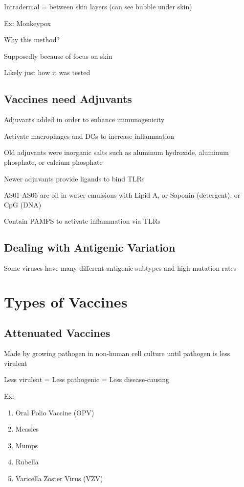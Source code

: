 \documentclass{notes}
\begin{document}
Intradermal = between skin layers (can see bubble under skin)

Ex: Monkeypox

Why this method?

\tab \indicates Supposedly because of focus on skin

\tab \indicates Likely just how it was tested

\subsection*{Vaccines need Adjuvants}
Adjuvants added in order to enhance immunogenicity

\tab \indicates Activate macrophages and DCs to increase inflammation

Old adjuvants were inorganic salts such as aluminum hydroxide, aluminum phosphate, or calcium phosphate

\tab \indicates Newer adjuvants provide ligands to bind TLRs

\tab \indicates AS01-AS06 are oil in water emulsions with Lipid A, or Saponin (detergent), or CpG (DNA)

\tab \tab \indicates Contain PAMPS to activate inflammation via TLRs

\subsection*{Dealing with Antigenic Variation}
Some viruses have many different antigenic subtypes and high mutation rates

\section*{Types of Vaccines}

\subsection*{Attenuated Vaccines}
Made by growing pathogen in non-human cell culture until pathogen is less virulent

\tab \indicates Less virulent = Less pathogenic = Less disease-causing

Ex:
\begin{enumerate}
    \item Oral Polio Vaccine (OPV)
    \item Measles
    \item Mumps
    \item Rubella
    \item Varicella Zoster Virus (VZV)
\end{enumerate}
\end{document}

